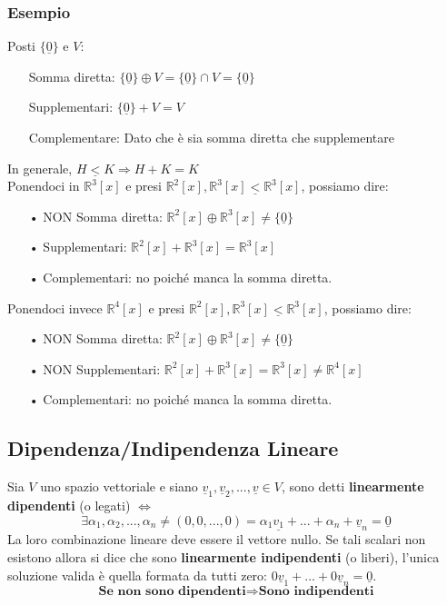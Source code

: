 \subsubsection{Esempio}
Posti $\{ \underline{0} \}$ e $V$:
\begin{itemize}
\item[]Somma diretta: $ \{ \underline{0} \} \oplus V = \{ \underline{0} \} \cap V = \{ \underline{0} \}$
\item[]Supplementari: $  \{ \underline{0} \} + V = V$
\item[]Complementare: Dato che è sia somma diretta che supplementare
\end{itemize}
In generale, $ H \underline{<} K \Rightarrow H + K = K $\\

Ponendoci in $\mathbb{R}^3[x]$ e presi $\mathbb{R}^2[x], \mathbb{R}^3[x] \underline{<} \mathbb{R}^3[x]$, possiamo dire:
\begin{itemize}
\item[•] NON Somma diretta: $ \mathbb{R}^2[x] \oplus \mathbb{R}^3[x] \neq \{ \underline{0}\} $
\item[•] Supplementari: $ \mathbb{R}^2[x] + \mathbb{R}^3[x] = \mathbb{R}^3[x]$
\item[•] Complementari: no poiché manca la somma diretta.
\end{itemize}


Ponendoci invece $\mathbb{R}^4[x]$ e presi $\mathbb{R}^2[x], \mathbb{R}^3[x] \underline{<} \mathbb{R}^3[x]$, possiamo dire:
\begin{itemize}
\item[•] NON Somma diretta: $ \mathbb{R}^2[x] \oplus \mathbb{R}^3[x] \neq \{ \underline{0}\} $
\item[•] NON Supplementari: $ \mathbb{R}^2[x] + \mathbb{R}^3[x] = \mathbb{R}^3[x] \neq \mathbb{R}^4[x]$
\item[•] Complementari: no poiché manca la somma diretta.
\end{itemize}


\subsection{Dipendenza/Indipendenza Lineare}
Sia $V$ uno spazio vettoriale e siano $\underline{v}_1, \underline{v}_2, ..., \underline{v} \in V$, sono detti \textbf{linearmente dipendenti} (o legati) $\Leftrightarrow$
$$ \exists \alpha_1, \alpha_2, ..., \alpha_n \neq (0,0,...,0) = \alpha_1\underline{v_1} + ... + \alpha_n+\underline{v}_n = \underline{0}$$
La loro combinazione lineare deve essere il vettore nullo.
Se tali scalari non esistono allora si dice che sono \textbf{linearmente indipendenti} (o liberi), l'unica soluzione valida è quella formata da tutti zero: $0\underline{v}_1+...+0\underline{v}_n = \underline{0}$.
$$ \textbf{Se non sono dipendenti} \Rightarrow \textbf{Sono indipendenti}$$

